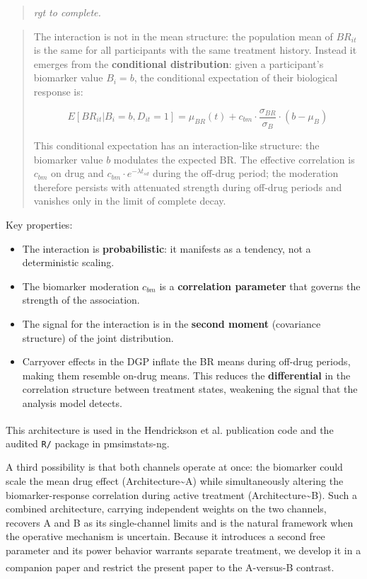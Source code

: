 \documentclass[
  11pt,
]{article}
\newenvironment{rgt}{%
  \begin{quote}\small\itshape\color[RGB]{20,60,160}}{%
  \end{quote}}
\newenvironment{orig}{%
  \begin{quote}\normalsize\color[gray]{0.55}}{%
  \end{quote}}
\begin{document}
\begin{rgt}
rgt to complete.

\end{rgt}

\begin{orig}
The interaction is not in the mean structure: the population mean of
\(BR_{it}\) is the same for all participants with the same treatment
history. Instead it emerges from the \textbf{conditional distribution}:
given a participant's biomarker value \(B_i = b\), the conditional
expectation of their biological response is:

\[E[BR_{it} | B_i = b, D_{it} = 1] = \mu_{BR}(t) + c_{bm}
\cdot \frac{\sigma_{BR}}{\sigma_B} \cdot (b - \mu_B)\]

This conditional expectation has an interaction-like structure: the
biomarker value \(b\) modulates the expected BR. The effective
correlation is \(c_{bm}\) on drug and \(c_{bm} \cdot
e^{-\lambda t_{sd}}\) during the off-drug period; the moderation
therefore persists with attenuated strength during off-drug periods and
vanishes only in the limit of complete decay.

\end{orig}

Key properties:

\begin{itemize}
\item The interaction is \textbf{probabilistic}: it manifests as a
  tendency, not a deterministic scaling.
\item The biomarker moderation $c_{bm}$ is a \textbf{correlation
  parameter} that governs the strength of the association.
\item The signal for the interaction is in the \textbf{second moment}
  (covariance structure) of the joint distribution.
\item Carryover effects in the DGP inflate the BR means during
  off-drug periods, making them resemble on-drug means. This
  reduces the \textbf{differential} in the correlation structure
  between treatment states, weakening the signal that the
  analysis model detects.
\end{itemize}

This architecture is used in the Hendrickson et
al.\textsuperscript{} publication code
and the audited \texttt{R/} package in pmsimstats-ng.

A third possibility is that both channels operate at once: the biomarker
could scale the mean drug effect (Architecture\textasciitilde A) while
simultaneously altering the biomarker-response correlation during active
treatment (Architecture\textasciitilde B). Such a combined architecture,
carrying independent weights on the two channels, recovers A and B as
its single-channel limits and is the natural framework when the
operative mechanism is uncertain. Because it introduces a second free
parameter and its power behavior warrants separate treatment, we develop
it in a companion
paper\textsuperscript{} and
restrict the present paper to the A-versus-B contrast.
\end{document}
